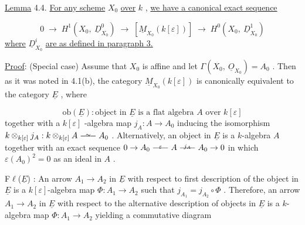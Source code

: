 \underline{Lemma} 4.4.  \underline{For any scheme} $X_0$ \underline{over} $k$ , \underline{we have a canonical exact sequence}

\begin{equation*}
0 \;\to\; H^{1}(X_{0},\ \underline{D}^{0}_{X_{0}}) \;\to\; [\underline{M}_{X_{0}}(k[\varepsilon])] \;\to\; H^{0}(X_{0},\ \underline{D}^{1}_{X_{0}})
\end{equation*}
\underline{where} $\underline{D}^{i}_{X_{0}}$ \underline{are as defined in paragraph 3.}

\underline{Proof}:  (Special case)  Assume that $X_{0}$ is affine and let $\Gamma(X_{0},\ \underline{O}_{X_{0}}) = A_{0}$ . Then as it was noted in 4.1(b), the category $\underline{M}_{X_{0}}(k[\varepsilon])$ is canonically equivalent to the category $\underline{E}$ , where

\begin{equation*}
\mathrm{ob}(\underline{E}) : \text{object in } \underline{E} \text{ is a flat algebra } A \text{ over } k[\varepsilon]
\end{equation*}
together with a  $k[\varepsilon]$ -algebra map  $j_{A} : A \to A_{0}$  inducing the isomorphism $k \otimes_{k[\varepsilon]} j_{A} : k \otimes_{k[\varepsilon]} A \overset{\sim}{\relbar\joinrel\relbar\joinrel\relbar} A_{0}$ . Alternatively, an object in $\underline{E}$ is a $k$-algebra $A$  together with an exact sequence  $0 \to A_{0} \overset{\varepsilon}{\relbar\joinrel\relbar\joinrel\relbar} A \overset{j_{A}}{\relbar\joinrel\relbar\joinrel\relbar} A_{0} \to 0$  in which $\varepsilon(A_{0})^{2} = 0$  as an ideal in  $A$ .

F$\ell$($\underline{E}$) :  An arrow  $A_{1} \to A_{2}$  in  $\underline{E}$  with respect to first description of the object in  $\underline{E}$  is a  $k[\varepsilon]$-algebra map  $\Phi : A_{1} \to A_{2}$  such that  $j_{A_{1}} = j_{A_{2}} \circ \Phi$ . Therefore, an arrow  $A_{1} \to A_{2}$  in  $\underline{E}$  with respect to the alternative description of objects in  $\underline{E}$  is a $k$-algebra map  $\Phi : A_{1} \to A_{2}$  yielding a commutative diagram

